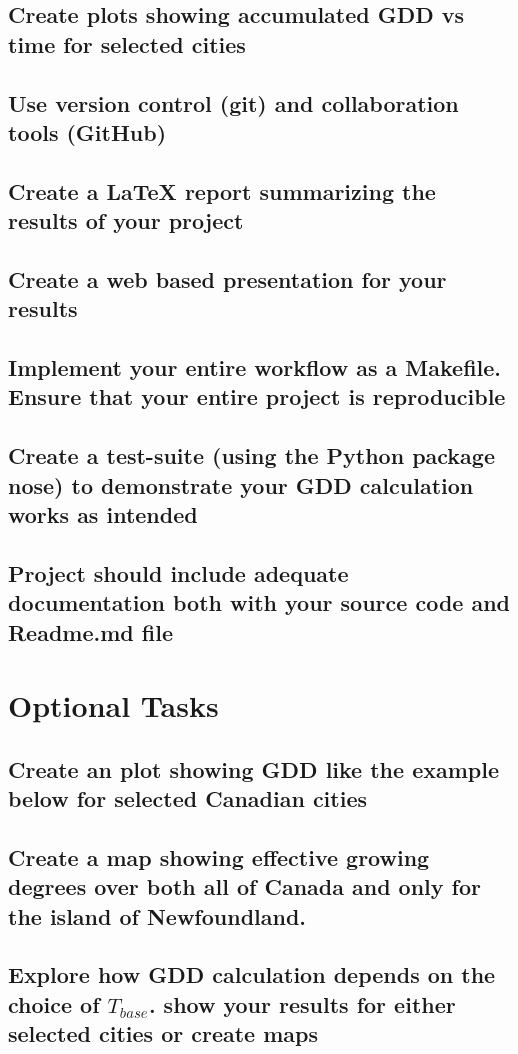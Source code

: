 \documentclass{article}
\begin{document}
\subsection{Create plots showing accumulated GDD vs time for selected cities}

\subsection{Use version control (git) and collaboration tools (GitHub)}
\subsection{Create a LaTeX report summarizing the results of your project}
\subsection{Create a web based presentation for your results}
\subsection{Implement your entire workflow as a Makefile. Ensure that your entire project is reproducible}
\subsection{Create a test-suite (using the Python package nose) to demonstrate your GDD calculation works as intended}
\subsection{Project should include adequate documentation both with your source code and Readme.md file}


\section{ \bf Optional Tasks}
\subsection{Create an plot showing GDD like the example below for selected Canadian cities}
\subsection{Create a map showing effective growing degrees over both all of Canada and only for the island of Newfoundland.}
\subsection{Explore how GDD calculation depends on the choice of $T_{base}$. show your results for either selected cities or create maps}
\end{document}
